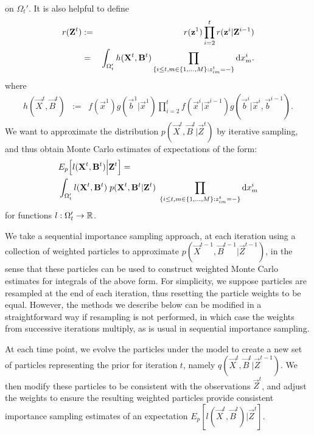 on $\Omega_t'$. It is also helpful to define
\begin{eqnarray*}
r(\mathbf{Z}^t) & := & r(\mathbf{z}^1) \prod_{i=2}^{t} r(\mathbf{z}^i | \mathbf{Z}^{i-1}) \\
& = & \int_{\Omega_t'}  h(\mathbf{X}^t,\mathbf{B}^t) \prod_{ \{ i \leq t, m \in \{1, \ldots, M \} : z^t_{im} = - \} } \operatorname{d}\!{x}^i_m.
\end{eqnarray*}
where
\begin{eqnarray*}
h(\vec{X}^t,\vec{B}^t) & := & f(\vec{x}^1)g(\vec{b}^1 | \vec{x}^1) \prod_{i=2}^{t} f(\vec{x}^i | \vec{x}^{i-1}) g(\vec{b}^i | \vec{x}^i , \vec{b}^{i-1}).
\end{eqnarray*}
We want to approximate the distribution $p(\vec{X}^{t}, \vec{B}^{t} | \vec{Z}^{t})$ by iterative sampling, and thus obtain Monte Carlo estimates of expectations of the form:
\begin{align*}
    &E_{p} \Big[l(\mathbf{X}^{t}, \mathbf{B}^{t} ) \Big| \mathbf{Z}^{t} \Big] = \\
    &\int_{\Omega_t'} l(\mathbf{X}^{t}, \mathbf{B}^{t})\; p(\mathbf{X}^{t}, \mathbf{B}^{t} | \mathbf{Z}^{t})\; \prod_{ \{ i \leq t, m \in \{1, \ldots, M \} : z^t_{im} = - \} } \operatorname{d}\!{x}^i_m
\end{align*}
for functions $l: \Omega_t' \rightarrow \mathbb R$. 

We take a sequential importance sampling approach, at each iteration using a collection of weighted particles to approximate $p(\vec{X}^{t-1}, \vec{B}^{t-1} | \vec{Z}^{t-1})$, in the sense that these particles can be used to construct weighted Monte Carlo estimates for integrals of the above form. For simplicity, we suppose particles are resampled at the end of each iteration, thus resetting the particle weights to be equal. However, the methods we describe below can be modified in a straightforward way if resampling is not performed, in which case the weights from successive iterations multiply, as is usual in sequential importance sampling.

At each time point, we evolve the particles under the model to create a new set of particles representing the prior for iteration $t$, namely $q(\vec{X}^{t}, \vec{B}^{t} | \vec{Z}^{t-1})$. We then modify these particles to be consistent with the observations $\vec{Z}^{t}$, and adjust the weights to ensure the resulting weighted particles provide consistent importance sampling estimates of an expectation $E_{p}[l(\vec{X}^{t}, \vec{B}^t) | \vec{Z}^t]$.

